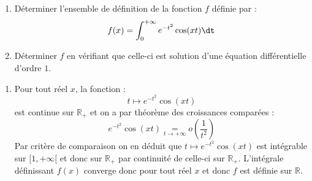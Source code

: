 \documentclass[a4paper,10pt]{report}
\begin{document}
\begin{Exercice}{}
\begin{enumerate}
\item Déterminer l'ensemble de définition de la fonction $f$ définie par :
$$ f(x) = \int_{0}^{+ \infty} e^{-t^2} \cos(xt) \dt$$
\item Déterminer $f$ en vérifiant que celle-ci est solution d'une équation différentielle d'ordre $1$.
\end{enumerate}
\end{Exercice}

\corr \begin{enumerate}
\item Pour tout réel $x$, la fonction :
$$t \mapsto e^{-t^2} \cos(xt)$$
est continue sur $\mathbb{R}_+$ et on a par théorème des croissances comparées :
$$ e^{-t^2} \cos(xt)  \underset{t \rightarrow + \infty}{=} o \left( \dfrac{1}{t^2} \right)$$
Par critère de comparaison on en déduit que $t \mapsto e^{-t^2} \cos(xt)$ est intégrable sur $[1, + \infty[$ et donc sur $\mathbb{R}_+$ par continuité de celle-ci sur $\mathbb{R}_+$. L'intégrale définissant $f(x)$ converge donc pour tout réel $x$ et donc $f$ est définie sur $\mathbb{R}$.


\end{enumerate}
\end{document}

